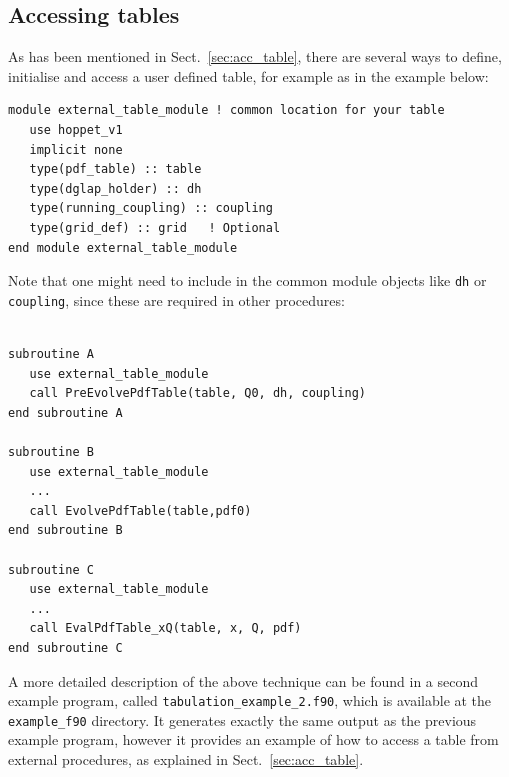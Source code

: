\documentclass[12pt]{article}
\newcommand{\ttt}[1]{\texttt{#1}}
\begin{document}
\subsection{Accessing tables}

As has been mentioned in Sect.~\ref{sec:acc_table}, 
there are several ways to define, initialise
and access a user defined table, for example 
as in the example below:
\begin{lstlisting}
module external_table_module ! common location for your table
   use hoppet_v1
   implicit none
   type(pdf_table) :: table
   type(dglap_holder) :: dh
   type(running_coupling) :: coupling
   type(grid_def) :: grid   ! Optional
end module external_table_module
\end{lstlisting}
Note that one might need to include in the common module objects
like \texttt{dh} or \ttt{coupling}, since these are
required in other procedures:
\begin{lstlisting}

subroutine A
   use external_table_module
   call PreEvolvePdfTable(table, Q0, dh, coupling)
end subroutine A

subroutine B
   use external_table_module
   ...
   call EvolvePdfTable(table,pdf0)
end subroutine B

subroutine C
   use external_table_module
   ...
   call EvalPdfTable_xQ(table, x, Q, pdf)
end subroutine C

\end{lstlisting}

A more detailed description of the above technique 
can be found in a 
second example program, called \ttt{tabulation\_example\_2.f90},
which is available at the \ttt{example\_f90} 
directory. It generates exactly
the same output as the previous example program, however it
provides an example of how to access a table from
external procedures, as explained in Sect.~\ref{sec:acc_table}.




\end{document}
